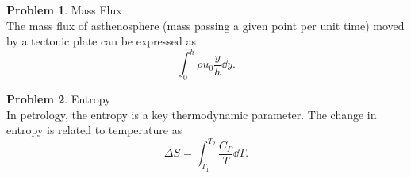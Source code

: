 \documentclass[final,a4paper,12pt]{article}
\theoremstyle{definition}
\newtheorem{problem}{Problem}[section]
\begin{document}
\begin{problem}
    Mass Flux \\
    The mass flux of asthenosphere (mass passing a given point per unit time)
    moved by a tectonic plate can be expressed as
    \begin{equation*}
        \int_0^h \rho u_0 \frac{y}{h} \dd{y} .
    \end{equation*}
\end{problem}

\begin{problem}
    Entropy \\
    In petrology, the entropy is a key thermodynamic parameter.  The change in
    entropy is related to temperature as
    \begin{equation}
        \Delta S = \int_{T_1}^{T_2} \frac{C_P}{T} \dd{T} .
    \end{equation}
\end{problem}
\end{document}
